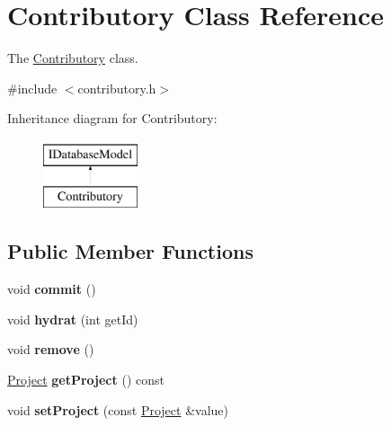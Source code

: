 \hypertarget{classContributory}{\section{Contributory Class Reference}
\label{classContributory}
}


The \hyperlink{classContributory}{Contributory} class.  




{\ttfamily \#include $<$contributory.\-h$>$}

Inheritance diagram for Contributory\-:\begin{figure}[H]
\begin{center}
\leavevmode
\includegraphics[height=2.000000cm]{d5/d09/classContributory}
\end{center}
\end{figure}
\subsection*{Public Member Functions}
\begin{DoxyCompactItemize}
\item 
\hypertarget{classContributory_a5c09902237bba780b594129dc2fa60d6}{void {\bfseries commit} ()}\label{classContributory_a5c09902237bba780b594129dc2fa60d6}

\item 
\hypertarget{classContributory_a7554352d3eaac4f1cd63e588e7e6cec1}{void {\bfseries hydrat} (int get\-Id)}\label{classContributory_a7554352d3eaac4f1cd63e588e7e6cec1}

\item 
\hypertarget{classContributory_a59641dbc35947c31eb841b46fed6130f}{void {\bfseries remove} ()}\label{classContributory_a59641dbc35947c31eb841b46fed6130f}

\item 
\hypertarget{classContributory_a181a6cd0d0f34d3f671e10aa24bf3a54}{\hyperlink{classProject}{Project} {\bfseries get\-Project} () const }\label{classContributory_a181a6cd0d0f34d3f671e10aa24bf3a54}

\item 
\hypertarget{classContributory_aeb7ffda52898c578d69805eb18922040}{void {\bfseries set\-Project} (const \hyperlink{classProject}{Project} \&value)}\label{classContributory_aeb7ffda52898c578d69805eb18922040}

\end{DoxyCompactItemize}


